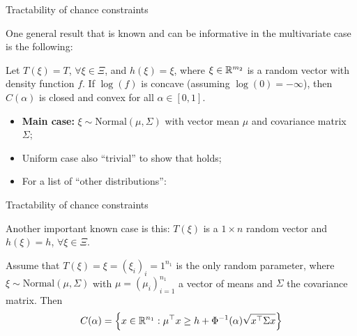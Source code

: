 \begin{frame}{Tractability of chance constraints}

	One general result that is known and can be informative in the multivariate case is the following:
	\begin{theorem}
		Let $T(\xi) = T$, $\forall \xi \in \Xi$, and $h(\xi) = \xi$, where $\xi \in \mathbb R^{m_2}$ is a random vector with density function $f$. If $\log(f)$ is concave (assuming $\log(0) = -\infty$), then $C(\alpha)$ is closed and convex for all $\alpha \in [0,1]$.
	\end{theorem}
	\pause
	\begin{itemize}
		\item {\bf Main case:} $\xi \sim \text{Normal}(\mu, \Sigma)$ with vector mean $\mu$ and covariance matrix $\Sigma$;
		\item Uniform case also ``trivial'' to show that holds;	
		\item For a list of ``other distributions'': \cite{nemirovski2007convex}
	\end{itemize}

	
\end{frame}



\begin{frame}{Tractability of chance constraints}

	Another important known case is this: $T(\xi)$ is a $1 \times n$ random vector and $h(\xi) = h$, $\forall \xi \in \Xi$.
	
	\begin{theorem}
		Assume that $T(\xi) = \xi = (\xi_i)_i=1^{n_1}$ is the only random parameter, where $\xi \sim \text{Normal}(\mu, \Sigma)$ with $\mu = (\mu_i)_{i=1}^{n_1}$ a vector of means and $\Sigma$ 	the covariance matrix. Then
		\begin{equation*}
			C(\alpha) = \left\{ x \in \mathbb R^{n_1} : \mu^\top x \ge h + \Phi^{-1}(\alpha)\sqrt{x^\top \Sigma x} \right \}
		\end{equation*}
	\end{theorem}
	
\end{frame}


